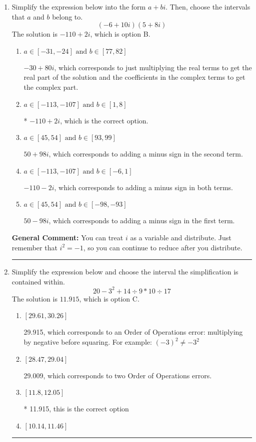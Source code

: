 \documentclass{extbook}[14pt]
\newcommand{\litem}[1]{\item #1

\rule{\textwidth}{0.4pt}}
\begin{document}
\begin{enumerate}\litem{
Simplify the expression below into the form $a+bi$. Then, choose the intervals that $a$ and $b$ belong to.
\[ (-6 + 10 i)(5 + 8 i) \]The solution is \( -110 + 2 i \), which is option B.\begin{enumerate}[label=\Alph*.]
\item \( a \in [-31, -24] \text{ and } b \in [77, 82] \)

 $-30 + 80 i$, which corresponds to just multiplying the real terms to get the real part of the solution and the coefficients in the complex terms to get the complex part.
\item \( a \in [-113, -107] \text{ and } b \in [1, 8] \)

* $-110 + 2 i$, which is the correct option.
\item \( a \in [45, 54] \text{ and } b \in [93, 99] \)

 $50 + 98 i$, which corresponds to adding a minus sign in the second term.
\item \( a \in [-113, -107] \text{ and } b \in [-6, 1] \)

 $-110 - 2 i$, which corresponds to adding a minus sign in both terms.
\item \( a \in [45, 54] \text{ and } b \in [-98, -93] \)

 $50 - 98 i$, which corresponds to adding a minus sign in the first term.
\end{enumerate}

\textbf{General Comment:} You can treat $i$ as a variable and distribute. Just remember that $i^2=-1$, so you can continue to reduce after you distribute.
}
\litem{
Simplify the expression below and choose the interval the simplification is contained within.
\[ 20 - 3^2 + 14 \div 9 * 10 \div 17 \]The solution is \( 11.915 \), which is option C.\begin{enumerate}[label=\Alph*.]
\item \( [29.61, 30.26] \)

 29.915, which corresponds to an Order of Operations error: multiplying by negative before squaring. For example: $(-3)^2 \neq -3^2$
\item \( [28.47, 29.04] \)

 29.009, which corresponds to two Order of Operations errors.
\item \( [11.8, 12.05] \)

* 11.915, this is the correct option
\item \( [10.14, 11.46] \)


\end{enumerate}}
\end{enumerate}
\end{document}
